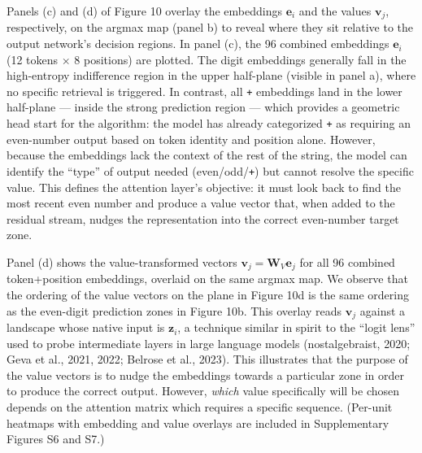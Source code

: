 \documentclass[
  11pt,
  a4paper,
]{article}
\begin{document}
Panels (c) and (d) of Figure 10 overlay the embeddings \(\mathbf{e}_i\)
and the values \(\mathbf{v}_j\), respectively, on the argmax map (panel
b) to reveal where they sit relative to the output network's decision
regions. In panel (c), the 96 combined embeddings \(\mathbf{e}_i\) (12
tokens \(\times\) 8 positions) are plotted. The digit embeddings
generally fall in the high-entropy indifference region in the upper
half-plane (visible in panel a), where no specific retrieval is
triggered. In contrast, all \texttt{+} embeddings land in the lower
half-plane --- inside the strong prediction region --- which provides a
geometric head start for the algorithm: the model has already
categorized \texttt{+} as requiring an even-number output based on token
identity and position alone. However, because the embeddings lack the
context of the rest of the string, the model can identify the ``type''
of output needed (even/odd/\texttt{+}) but cannot resolve the specific
value. This defines the attention layer's objective: it must look back
to find the most recent even number and produce a value vector that,
when added to the residual stream, nudges the representation into the
correct even-number target zone.

Panel (d) shows the value-transformed vectors
\(\mathbf{v}_j = \mathbf{W}_V \mathbf{e}_j\) for all 96 combined
token+position embeddings, overlaid on the same argmax map. We observe
that the ordering of the value vectors on the plane in Figure 10d is the
same ordering as the even-digit prediction zones in Figure 10b. This
overlay reads \(\mathbf{v}_j\) against a landscape whose native input is
\(\mathbf{z}_i\), a technique similar in spirit to the ``logit lens''
used to probe intermediate layers in large language models
(nostalgebraist, 2020; Geva et al., 2021, 2022; Belrose et al., 2023).
This illustrates that the purpose of the value vectors is to nudge the
embeddings towards a particular zone in order to produce the correct
output. However, \emph{which} value specifically will be chosen depends
on the attention matrix which requires a specific sequence. (Per-unit
heatmaps with embedding and value overlays are included in Supplementary
Figures S6 and S7.)
\end{document}
